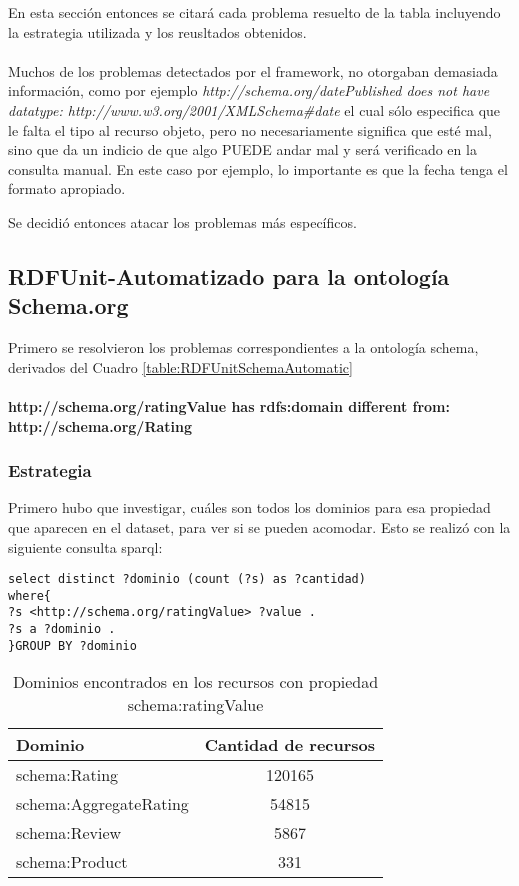En esta sección entonces se citará cada problema resuelto de la tabla incluyendo la estrategia utilizada y los reusltados obtenidos.
\\\\
Muchos de los problemas detectados por el framework, no otorgaban demasiada información, como por ejemplo
\textit{http://schema.org/datePublished does not have datatype: http://www.w3.org/2001/XMLSchema\#date} el cual sólo especifica que le 
falta el tipo al recurso objeto, pero no necesariamente significa que esté mal, sino que da un indicio de que algo PUEDE andar mal
y será verificado en la consulta manual. En este caso por ejemplo, lo importante es que la fecha tenga el formato apropiado.

Se decidió entonces atacar los problemas más específicos.
\subsection{RDFUnit-Automatizado para la ontología Schema.org}
Primero se resolvieron los problemas correspondientes a la ontología schema, derivados del Cuadro \ref{table:RDFUnitSchemaAutomatic}
\\\\
\textbf{http://schema.org/ratingValue has rdfs:domain different from: \\\noindent http://schema.org/Rating}

\subsubsection*{Estrategia}
Primero hubo que investigar, cuáles son todos los dominios para esa propiedad que aparecen en el dataset, para ver si se pueden 
acomodar. Esto se realizó con la siguiente consulta sparql:
\newpage
\begin{lstlisting}[frame=single]  
select distinct ?dominio (count (?s) as ?cantidad) 
where{
?s <http://schema.org/ratingValue> ?value .
?s a ?dominio .
}GROUP BY ?dominio
\end{lstlisting}

\begin{table}[h]
\begin{tabular}{| l | c |}\hline
 Dominio & Cantidad de recursos \\\hline
 schema:Rating & 120165\\
 schema:AggregateRating & 54815 \\
 schema:Review & 5867 \\
 schema:Product & 331 \\\hline
\end{tabular}
\caption{Dominios encontrados en los recursos con propiedad schema:ratingValue}
\label{table:ratingValueDomains}
\end{table}

